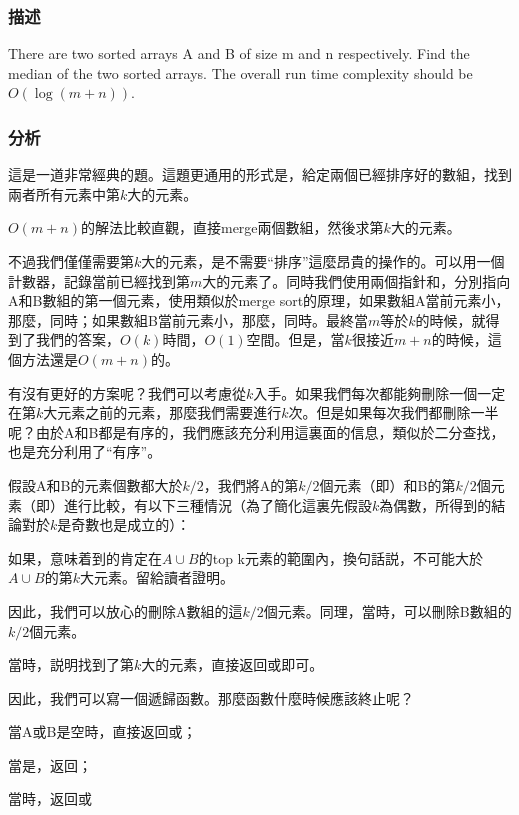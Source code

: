 \subsubsection{描述}
There are two sorted arrays A and B of size m and n respectively. Find the median of the two sorted arrays. The overall run time complexity should be $O(\log (m+n))$.


\subsubsection{分析}
這是一道非常經典的題。這題更通用的形式是，給定兩個已經排序好的數組，找到兩者所有元素中第$k$大的元素。

$O(m+n)$的解法比較直觀，直接merge兩個數組，然後求第$k$大的元素。

不過我們僅僅需要第$k$大的元素，是不需要“排序”這麼昂貴的操作的。可以用一個計數器，記錄當前已經找到第$m$大的元素了。同時我們使用兩個指針和，分別指向A和B數組的第一個元素，使用類似於merge sort的原理，如果數組A當前元素小，那麼，同時；如果數組B當前元素小，那麼，同時。最終當$m$等於$k$的時候，就得到了我們的答案，$O(k)$時間，$O(1)$空間。但是，當$k$很接近$m+n$的時候，這個方法還是$O(m+n)$的。

有沒有更好的方案呢？我們可以考慮從$k$入手。如果我們每次都能夠刪除一個一定在第$k$大元素之前的元素，那麼我們需要進行$k$次。但是如果每次我們都刪除一半呢？由於A和B都是有序的，我們應該充分利用這裏面的信息，類似於二分查找，也是充分利用了“有序”。

假設A和B的元素個數都大於$k/2$，我們將A的第$k/2$個元素（即）和B的第$k/2$個元素（即）進行比較，有以下三種情況（為了簡化這裏先假設$k$為偶數，所得到的結論對於$k$是奇數也是成立的）：
\begindot
\item {}
\item {}
\item {}
\myenddot

如果，意味着到的肯定在$A \cup B$的top k元素的範圍內，換句話説，不可能大於$A \cup B$的第$k$大元素。留給讀者證明。

因此，我們可以放心的刪除A數組的這$k/2$個元素。同理，當時，可以刪除B數組的$k/2$個元素。

當時，説明找到了第$k$大的元素，直接返回或即可。

因此，我們可以寫一個遞歸函數。那麼函數什麼時候應該終止呢？
\begindot
\item 當A或B是空時，直接返回或；
\item 當是，返回；
\item 當時，返回或
\myenddot


